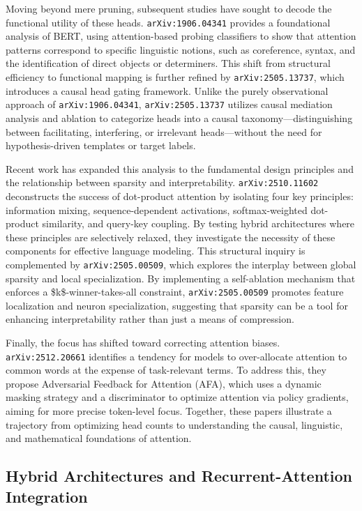 \documentclass[11pt]{article}
\begin{document}
Moving beyond mere pruning, subsequent studies have sought to decode the functional utility of these heads. \texttt{arXiv:1906.04341} provides a foundational analysis of BERT, using attention-based probing classifiers to show that attention patterns correspond to specific linguistic notions, such as coreference, syntax, and the identification of direct objects or determiners. This shift from structural efficiency to functional mapping is further refined by \texttt{arXiv:2505.13737}, which introduces a causal head gating framework. Unlike the purely observational approach of \texttt{arXiv:1906.04341}, \texttt{arXiv:2505.13737} utilizes causal mediation analysis and ablation to categorize heads into a causal taxonomy—distinguishing between facilitating, interfering, or irrelevant heads—without the need for hypothesis-driven templates or target labels.

Recent work has expanded this analysis to the fundamental design principles and the relationship between sparsity and interpretability. \texttt{arXiv:2510.11602} deconstructs the success of dot-product attention by isolating four key principles: information mixing, sequence-dependent activations, softmax-weighted dot-product similarity, and query-key coupling. By testing hybrid architectures where these principles are selectively relaxed, they investigate the necessity of these components for effective language modeling. This structural inquiry is complemented by \texttt{arXiv:2505.00509}, which explores the interplay between global sparsity and local specialization. By implementing a self-ablation mechanism that enforces a \$k\$-winner-takes-all constraint, \texttt{arXiv:2505.00509} promotes feature localization and neuron specialization, suggesting that sparsity can be a tool for enhancing interpretability rather than just a means of compression.

Finally, the focus has shifted toward correcting attention biases. \texttt{arXiv:2512.20661} identifies a tendency for models to over-allocate attention to common words at the expense of task-relevant terms. To address this, they propose Adversarial Feedback for Attention (AFA), which uses a dynamic masking strategy and a discriminator to optimize attention via policy gradients, aiming for more precise token-level focus. Together, these papers illustrate a trajectory from optimizing head counts to understanding the causal, linguistic, and mathematical foundations of attention.

\subsection{Hybrid Architectures and Recurrent-Attention Integration}
\end{document}

